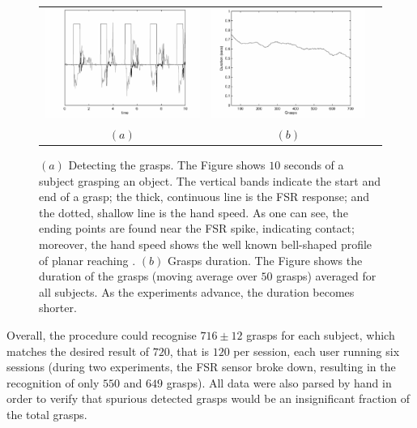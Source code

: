 \begin{figure}[htbp]
  \begin{center}
    \begin{tabular}{ccc}
      \includegraphics[width=0.48\linewidth]{grasp_seq_scotch.eps} &
      \includegraphics[width=0.48\linewidth]{grasp_trend.eps} \\
      $(a)$ & $(b)$
    \end{tabular}
    \caption{$(a)$ Detecting the grasps. The Figure shows $10$ seconds
    of a subject grasping an object. The vertical bands indicate the start
    and end of a grasp; the thick, continuous line is the FSR response; and the
    dotted, shallow line is the hand speed. As one can see, the ending points
    are found near the FSR spike, indicating contact; moreover, the
    hand speed shows the well known bell-shaped profile of planar
    reaching \cite{morasso-81}. 
    $(b)$ Grasps duration. The Figure shows the duration of the
    grasps (moving average over $50$ grasps) averaged for all
    subjects. As the experiments advance, the duration becomes shorter.}
    \label{fig:grasp_sequence}
  \end{center}
\end{figure}

Overall, the procedure could recognise $716 \pm 12$ grasps for each
subject, which matches the desired result of $720$, that is $120$ per
session, each user running six sessions (during two experiments, the
FSR sensor broke down, resulting in the recognition of only $550$ and
$649$ grasps). All data were also parsed by hand in order to verify
that spurious detected grasps would be an insignificant fraction of
the total grasps.


